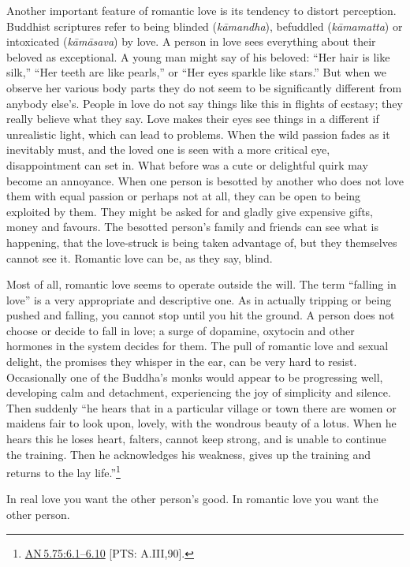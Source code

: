 \documentclass[10pt, openright]{book}
\newenvironment{epigram-2}%
{%
\vspace{1em}
\noindent
\quoting[leftmargin=2.5cm,rightmargin=2.5cm]%
\begin{itshape}
\large
}%
{\end{itshape}\endquoting
}%
\begin{document}
Another important feature of romantic love is its tendency to distort perception. Buddhist scriptures refer to being blinded (\textit{kāmandha}), befuddled (\textit{kāmamatta}) or intoxicated (\textit{kāmāsava}) by love. A person in love sees everything about their beloved as exceptional. A young man might say of his beloved: “Her hair is like silk,” “Her teeth are like pearls,” or “Her eyes sparkle like stars.” But when we observe her various body parts they do not seem to be significantly different from anybody else’s. People in love do not say things like this in flights of ecstasy; they really believe what they say. Love makes their eyes see things in a different if unrealistic light, which can lead to problems. When the wild passion fades as it inevitably must, and the loved one is seen with a more critical eye, disappointment can set in. What before was a cute or delightful quirk may become an annoyance. When one person is besotted by another who does not love them with equal passion or perhaps not at all, they can be open to being exploited by them. They might be asked for and gladly give expensive gifts, money and favours. The besotted person’s family and friends can see what is happening, that the love-struck is being taken advantage of, but they themselves cannot see it. Romantic love can be, as they say, blind.


Most of all, romantic love seems to operate outside the will. The term “falling in love” is a very appropriate and descriptive one. As in actually tripping or being pushed and falling, you cannot stop until you hit the ground. A person does not choose or decide to fall in love; a surge of dopamine, oxytocin and other hormones in the system decides for them. The pull of romantic love and sexual delight, the promises they whisper in the ear, can be very hard to resist. Occasionally one of the Buddha’s monks would appear to be progressing well, developing calm and detachment, experiencing the joy of simplicity and silence. Then suddenly “he hears that in a particular village or town there are women or maidens fair to look upon, lovely, with the wondrous beauty of a lotus. When he hears this he loses heart, falters, cannot keep strong, and is unable to continue the training. Then he acknowledges his weakness, gives up the training and returns to the lay life.”\footnote {\href{https://suttacentral.net/an5.75/en/sujato\#6.1}{AN 5.75:6.1–6.10} [PTS: A.III,90].}


\begin{epigram-2}
In real love you want the other person’s good. In romantic love you want the other person.
\end{epigram-2}
\end{document}
